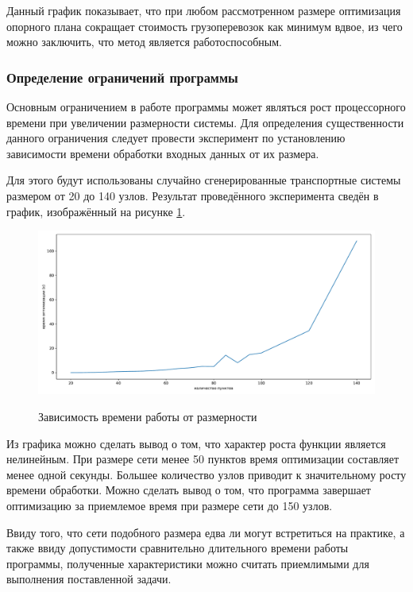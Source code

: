 Данный график показывает, что при любом рассмотренном размере оптимизация опорного плана сокращает стоимость грузоперевозок как минимум вдвое, из чего можно заключить, что метод является работоспособным.

\subsubsection{Определение ограничений программы}
Основным ограничением в работе программы может являться рост процессорного времени при увеличении размерности системы. Для определения существенности данного ограничения следует провести эксперимент по установлению зависимости времени обработки входных данных от их размера.

\pagebreak
Для этого будут использованы случайно сгенерированные транспортные системы размером от 20 до 140 узлов. Результат проведённого эксперимента сведён в график, изображённый на рисунке \ref{exp:timing}.

\begin{figure}[h!]
	\begin{center}
		{\includegraphics[scale=0.5, angle=0, page=1]{research/timing.pdf}}
		\caption{Зависимость времени работы от размерности}
		\label{exp:timing}
	\end{center}
\end{figure}

Из графика можно сделать вывод о том, что характер роста функции является нелинейным. При размере сети менее 50 пунктов время оптимизации составляет менее одной секунды. Большее количество узлов приводит к значительному росту времени обработки. Можно сделать вывод о том, что программа завершает оптимизацию за приемлемое время при размере сети до 150 узлов. 

Ввиду того, что сети подобного размера едва ли могут встретиться на практике, а также ввиду допустимости сравнительно длительного времени работы программы, полученные характеристики можно считать приемлимыми для выполнения поставленной задачи.

